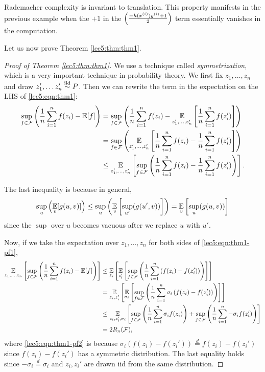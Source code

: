 \begin{remark}
Rademacher complexity is invariant to translation. This property manifests in the previous example when the $+1$ in the $\left(\frac{-h(x^{(i)})y^{(i)}+1}{2}\right)$ term essentially vanishes in the computation.
\end{remark}

Let us now prove Theorem \ref{lec5:thm:thm1}.

\begin{proof}[Proof of Theorem \ref{lec5:thm:thm1}]
We use a technique called \textit{symmetrization}, which is a very important technique in probability theory. We first fix $z_1, \dots, z_n$and draw $ z_1', \dots z_n' \overset{\textup{iid}}{\sim} P$. Then we can rewrite the term in the expectation on the LHS of \eqref{lec5:eqn:thm1}:
\begin{align}
    \sup_{f \in \mathcal F} \left( \frac{1}{n} \sum^n_{i=1} f(z_i) - \operatorname*{\mathbb{E}}[f] \right) &= \sup_{f \in \mathcal F} \left( \frac{1}{n} \sum^n_{i=1} f(z_i) - \operatorname*{\mathbb{E}}_{z_1',\dots, z_n'} \left[ \frac{1}{n} \sum^n_{i=1} f(z_i')\right] \right) \\
    &= \sup_{f \in \mathcal F} \left( \operatorname*{\mathbb{E}}_{z_1',\dots, z_n'} \left[\frac{1}{n} \sum^n_{i=1} f(z_i) -  \frac{1}{n} \sum^n_{i=1} f(z_i')\right] \right)\\
    &\leq \operatorname*{\mathbb{E}}_{z_1',\dots, z_n'} \left[\sup_{f \in \mathcal F} \left( \frac{1}{n} \sum^n_{i=1} f(z_i) -  \frac{1}{n} \sum^n_{i=1} f(z_i')\right)\right]. \label{lec5:eqn:thm1-pf1}
\end{align}

The last inequality is because in general,
\begin{align}
    \sup_u \left(\operatorname*{\mathbb{E}}_v[g(u,v)]\right) \leq \sup_u \left( \operatorname*{\mathbb{E}}_v\left[\sup_{u'}(g(u',v))\right]\right) = \operatorname*{\mathbb{E}}_v \left[\sup_u (g(u,v))\right]
\end{align}
since the $\sup$ over $u$ becomes vacuous after we replace $u$ with $u'$.

Now, if we take the expectation over $z_1, \dots, z_n$ for both sides of \eqref{lec5:eqn:thm1-pf1},
\begin{align}
    \operatorname*{\mathbb{E}}_{z_1, \dots, z_n} \left[\sup_{f \in \mathcal F} \left( \frac{1}{n} \sum^n_{i=1} f(z_i) - \operatorname*{\mathbb{E}}[f] \right) \right] 
    &\leq \operatorname*{\mathbb{E}}_{z_i} \left[ \operatorname*{\mathbb{E}}_{z_i'} \left[\sup_{f \in \mathcal F} \left( \frac{1}{n} \sum^n_{i=1} \left(f(z_i) -  f(z_i')\right)\right)\right]\right]\\
    &= \operatorname*{\mathbb{E}}_{z_i,z_i'} \left[ \operatorname*{\mathbb{E}}_{\sigma_i} \left[\sup_{f \in \mathcal F} \left( \frac{1}{n} \sum^n_{i=1} \sigma_i\left(f(z_i) -  f(z_i')\right)\right)\right]\right] \label{lec5:eqn:thm1-pf2} \\
 &\leq \operatorname*{\mathbb{E}}_{z_i,z_i', \sigma_i} \left[\sup_{f \in \mathcal F} \left( \frac{1}{n} \sum^n_{i=1} \sigma_i f(z_i)\right)+\sup_{f \in \mathcal F} \left( \frac{1}{n} \sum^n_{i=1} -\sigma_i f(z_i')\right)\right] \\
    &= 2R_n(\mathcal F),
\end{align}
where \eqref{lec5:eqn:thm1-pf2} is because $\sigma_i(f(z_i) - f(z_i')) \stackrel{d}{=} f(z_i) - f(z_i')$ since $f(z_i) - f(z_i')$ has a symmetric distribution. The last equality holds since $-\sigma_i \overset{d}{=} \sigma_i$ and $z_i, z_i'$ are drawn iid from the same distribution. 
\end{proof}

